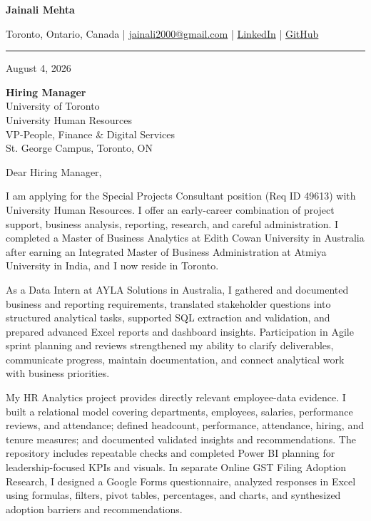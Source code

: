 \documentclass[letterpaper,10pt]{article}
\begin{document}
\begin{center}
  {\fontsize{17}{19}\selectfont\textbf{Jainali Mehta}}\par\vspace{2pt}
  \small Toronto, Ontario, Canada \;|\;
  \href{mailto:jainali2000@gmail.com}{jainali2000@gmail.com} \;|\;
  \href{https://www.linkedin.com/in/jainali-mehta}{LinkedIn} \;|\;
  \href{https://github.com/jainalimehta}{GitHub}
\end{center}
\vspace{-5pt}
\noindent\rule{\textwidth}{0.4pt}

August 4, 2026

\textbf{Hiring Manager}\\
University of Toronto\\
University Human Resources\\
VP-People, Finance \& Digital Services\\
St. George Campus, Toronto, ON

Dear Hiring Manager,

I am applying for the Special Projects Consultant position (Req ID 49613) with University Human Resources. I offer an early-career combination of project support, business analysis, reporting, research, and careful administration. I completed a Master of Business Analytics at Edith Cowan University in Australia after earning an Integrated Master of Business Administration at Atmiya University in India, and I now reside in Toronto.

As a Data Intern at AYLA Solutions in Australia, I gathered and documented business and reporting requirements, translated stakeholder questions into structured analytical tasks, supported SQL extraction and validation, and prepared advanced Excel reports and dashboard insights. Participation in Agile sprint planning and reviews strengthened my ability to clarify deliverables, communicate progress, maintain documentation, and connect analytical work with business priorities.

My HR Analytics project provides directly relevant employee-data evidence. I built a relational model covering departments, employees, salaries, performance reviews, and attendance; defined headcount, performance, attendance, hiring, and tenure measures; and documented validated insights and recommendations. The repository includes repeatable checks and completed Power BI planning for leadership-focused KPIs and visuals. In separate Online GST Filing Adoption Research, I designed a Google Forms questionnaire, analyzed responses in Excel using formulas, filters, pivot tables, percentages, and charts, and synthesized adoption barriers and recommendations.
\end{document}
